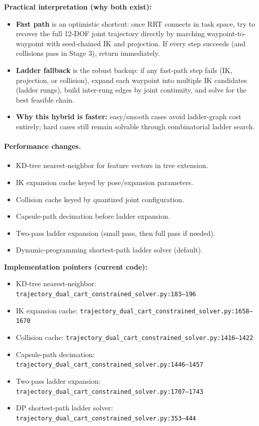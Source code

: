 \documentclass[11pt]{article}
\begin{document}
\noindent\textbf{Practical interpretation (why both exist):}
\begin{itemize}
  \item \textbf{Fast path} is an optimistic shortcut: once RRT connects in task space, try to recover the full
        12-DOF joint trajectory directly by marching waypoint-to-waypoint with seed-chained IK and projection.
        If every step succeeds (and collisions pass in Stage 3), return immediately.
  \item \textbf{Ladder fallback} is the robust backup: if any fast-path step fails (IK, projection, or collision),
        expand each waypoint into multiple IK candidates (ladder rungs), build inter-rung edges by joint continuity,
        and solve for the best feasible chain.
  \item \textbf{Why this hybrid is faster:} easy/smooth cases avoid ladder-graph cost entirely; hard cases still
        remain solvable through combinatorial ladder search.
\end{itemize}

\paragraph{Performance changes.}
\begin{itemize}
  \item KD-tree nearest-neighbor for feature vectors in tree extension.
  \item IK expansion cache keyed by pose/expansion parameters.
  \item Collision cache keyed by quantized joint configuration.
  \item Capsule-path decimation before ladder expansion.
  \item Two-pass ladder expansion (small pass, then full pass if needed).
  \item Dynamic-programming shortest-path ladder solver (default).
\end{itemize}

\noindent\textbf{Implementation pointers (current code):}
\begin{itemize}
  \item KD-tree nearest-neighbor: \texttt{trajectory\_dual\_cart\_constrained\_solver.py:183--196}
  \item IK expansion cache: \texttt{trajectory\_dual\_cart\_constrained\_solver.py:1658--1670}
  \item Collision cache: \texttt{trajectory\_dual\_cart\_constrained\_solver.py:1416--1422}
  \item Capsule-path decimation: \texttt{trajectory\_dual\_cart\_constrained\_solver.py:1446--1457}
  \item Two-pass ladder expansion: \texttt{trajectory\_dual\_cart\_constrained\_solver.py:1707--1743}
  \item DP shortest-path ladder solver: \texttt{trajectory\_dual\_cart\_constrained\_solver.py:353--444}
\end{itemize}
\end{document}
